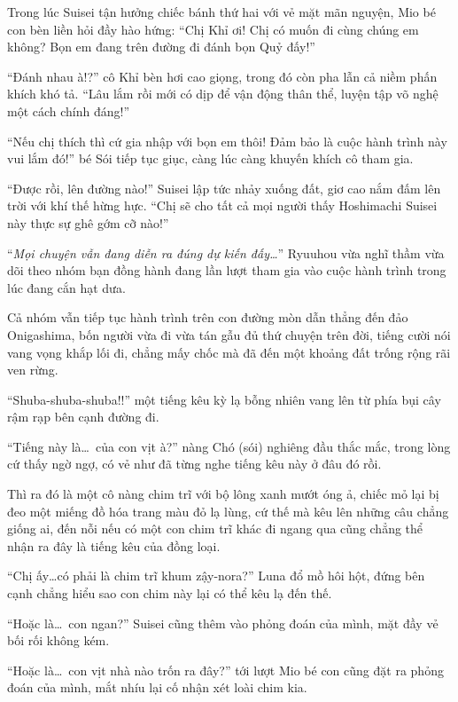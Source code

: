 \documentclass[../main.tex]{subfiles}
\begin{document}
Trong lúc Suisei tận hưởng chiếc bánh thứ hai với vẻ mặt mãn nguyện, Mio bé con bèn liền hỏi đầy hào hứng: ``Chị Khỉ ơi! Chị có muốn đi cùng chúng em không? Bọn em đang trên đường đi đánh bọn Quỷ đấy!''

``Đánh nhau à!?'' cô Khỉ bèn hơi cao giọng, trong đó còn pha lẫn cả niềm phấn khích khó tả. ``Lâu lắm rồi mới có dịp để vận động thân thể, luyện tập võ nghệ một cách chính đáng!''

``Nếu chị thích thì cứ gia nhập với bọn em thôi! Đảm bảo là cuộc hành trình này vui lắm đó!'' bé Sói tiếp tục giục, càng lúc càng khuyến khích cô tham gia.

``Được rồi, lên đường nào!'' Suisei lập tức nhảy xuống đất, giơ cao nắm đấm lên trời với khí thế hừng hực. ``Chị sẽ cho tất cả mọi người thấy Hoshimachi Suisei này thực sự ghê gớm cỡ nào!''

``\textit{Mọi chuyện vẫn đang diễn ra đúng dự kiến đấy\dots}'' Ryuuhou vừa nghĩ thầm vừa dõi theo nhóm bạn đồng hành đang lần lượt tham gia vào cuộc hành trình trong lúc đang cắn hạt dưa.

\ct

Cả nhóm vẫn tiếp tục hành trình trên con đường mòn dẫn thẳng đến đảo Onigashima, bốn người vừa đi vừa tán gẫu đủ thứ chuyện trên đời, tiếng cười nói vang vọng khắp lối đi, chẳng mấy chốc mà đã đến một khoảng đất trống rộng rãi ven rừng.

``Shuba-shuba-shuba!!'' một tiếng kêu kỳ lạ bỗng nhiên vang lên từ phía bụi cây rậm rạp bên cạnh đường đi.

``Tiếng này là\dots\ của con vịt à?'' nàng Chó (sói) nghiêng đầu thắc mắc, trong lòng cứ thấy ngờ ngợ, có vẻ như đã từng nghe tiếng kêu này ở đâu đó rồi.

Thì ra đó là một cô nàng chim trĩ với bộ lông xanh mướt óng ả, chiếc mỏ lại bị đeo một miếng đồ hóa trang màu đỏ lạ lùng, cứ thế mà kêu lên những câu chẳng giống ai, đến nỗi nếu có một con chim trĩ khác đi ngang qua cũng chẳng thể nhận ra đây là tiếng kêu của đồng loại.

``Chị ấy\dots có phải là chim trĩ khum zậy-nora?'' Luna đổ mồ hôi hột, đứng bên cạnh chẳng hiểu sao con chim này lại có thể kêu lạ đến thế.

``Hoặc là\dots\ con ngan?'' Suisei cũng thêm vào phỏng đoán của mình, mặt đầy vẻ bối rối không kém.

``Hoặc là\dots\ con vịt nhà nào trốn ra đây?'' tới lượt Mio bé con cũng đặt ra phỏng đoán của mình, mắt nhíu lại cố nhận xét loài chim kia.
\end{document}
